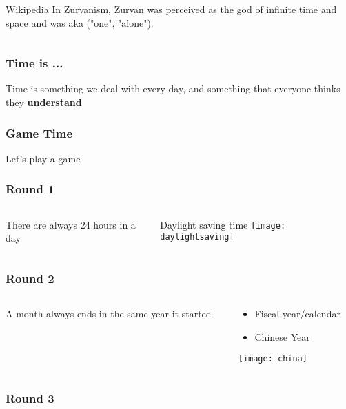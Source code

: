 \documentclass[aspectratio=169]{beamer}
\begin{document}
{\begin{gdblank}
\begin{columns}
\begin{column}{0.5\textwidth}
				\begin{block}{Wikipedia}
					In Zurvanism, Zurvan was perceived as the god of infinite time and space and was aka ("one", "alone").
				\end{block} 
			\end{column}
		\end{columns}     
	\end{gdblank}
	\begin{gdblank}
		\frametitle{Time is ...}
		\LARGE\centering Time is something we deal with every day, and something that everyone thinks they 
		\bf understand
	\end{gdblank} 
	\begin{gdblank}
		\frametitle{Game Time}
		\Huge\centering Let's play a game
	\end{gdblank} 
	\begin{gdblank}
		\frametitle{Round 1}    
		\begin{columns}
			\begin{column}{0.70\textwidth}
				\LARGE There are always 24 hours in a day 
				\pause     
			\end{column}
			\begin{column}{0.3\textwidth}
				\large\centering Daylight saving time 
				\vskip0.5cm
				\texttt{[image: daylightsaving]}
			\end{column}
		\end{columns}
	\end{gdblank} 
	\begin{gdblank}
		\frametitle{Round 2}    
		\begin{columns}
			\begin{column}{0.70\textwidth}
				\LARGE A month always ends in the same year it started
				\pause     
			\end{column}
			\begin{column}{0.3\textwidth}
				\large\centering 
				\begin{itemize}
					\item Fiscal year/calendar
					\item Chinese Year
				\end{itemize}
				\vskip0.5cm
				\texttt{[image: china]}
			\end{column}
		\end{columns}
	\end{gdblank} 
	\begin{gdblank}
		\frametitle{Round 3}    
		\begin{columns}
			\begin{column}{0.70\textwidth}

\end{column}
\end{columns}
\end{gdblank}}
\end{document}
